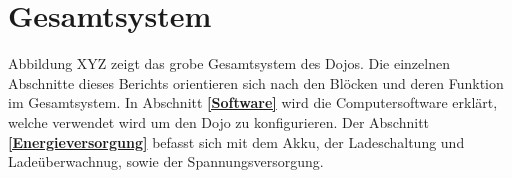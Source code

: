 \chapter{Gesamtsystem}
\thispagestyle{fancy} 

Abbildung XYZ zeigt das grobe Gesamtsystem des Dojos. Die einzelnen Abschnitte dieses Berichts orientieren sich nach den Blöcken und deren Funktion im Gesamtsystem. In Abschnitt \textbf{\ref{Software} } wird die Computersoftware erklärt, welche verwendet wird um den Dojo zu konfigurieren. Der Abschnitt \textbf{\ref{Energieversorgung} } befasst sich mit dem Akku, der Ladeschaltung und Ladeüberwachnug, sowie der Spannungsversorgung.